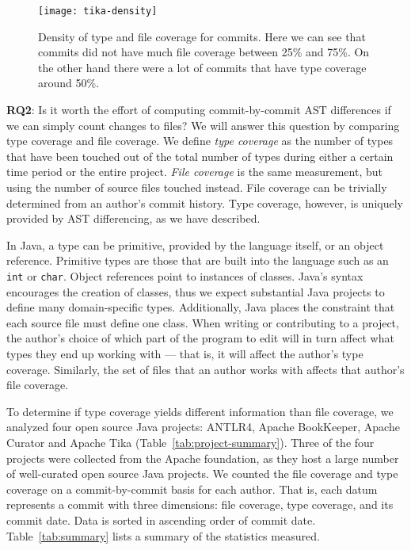 \begin{figure}[ht]
\centering
\texttt{[image: tika-density]}
\caption{Density of type and file coverage for commits. Here we can see that commits did not have much file coverage between 25\% and 75\%. On the other hand there were a lot of commits that have type coverage around 50\%.\label{fig:tika-density}}
\end{figure}

\textbf{RQ2}: Is it worth the effort of computing commit-by-commit AST differences if we can simply count changes to files? We will answer this question by comparing type coverage and file coverage. We define \emph{type coverage} as the number of types that have been touched out of the total number of types during either a certain time period or the entire project. \emph{File coverage} is the same measurement, but using the number of source files touched instead. File coverage can be trivially determined from an author's commit history. Type coverage, however, is uniquely provided by AST differencing, as we have described.

In Java, a type can be primitive, provided by the language itself, or an object reference. Primitive types are those that are built into the language such as an \texttt{int} or \texttt{char}. Object references point to instances of classes. Java's syntax encourages the creation of classes, thus we expect substantial Java projects to define many domain-specific types. Additionally, Java places the constraint that each source file must define one class. When writing or contributing to a project, the author's choice of which part of the program to edit will in turn affect what types they end up working with --- that is, it will affect the author's type coverage. Similarly, the set of files that an author works with affects that author's file coverage.

To determine if type coverage yields different information than file coverage, we analyzed four open source Java projects: ANTLR4, Apache BookKeeper, Apache Curator and Apache Tika (Table~\ref{tab:project-summary}). Three of the four projects were collected from the Apache foundation, as they host a large number of well-curated open source Java projects. We counted the file coverage and type coverage on a commit-by-commit basis for each author. That is, each datum represents a commit with three dimensions: file coverage, type coverage, and its commit date. Data is sorted in ascending order of commit date. Table~\ref{tab:summary} lists a summary of the statistics measured.

